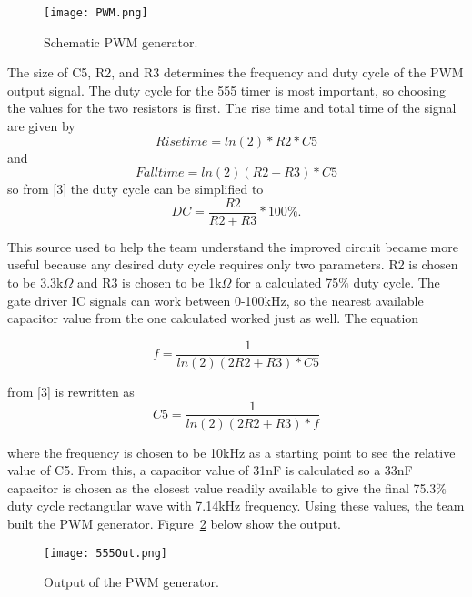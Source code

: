 \documentclass[11pt,letter]{article}
\begin{document}
\begin{figure}[H]
    \centering
    \texttt{[image: PWM.png]}
    \caption{Schematic PWM generator.}
    \label{fig:PWM}
\end{figure}

The size of C5, R2, and R3 determines the frequency and duty cycle of the PWM output signal. The duty cycle for the 555 timer is most important, so choosing the values for the two resistors is first. The rise time and total time of the signal are given by
\begin{equation}
    Risetime = ln(2)*R2*C5
\end{equation}
and
\begin{equation}
     Falltime = ln(2)(R2+R3)*C5
\end{equation}
so from [3] the duty cycle can be simplified to
\begin{equation}
    DC = \frac{R2}{R2+R3}*100\%.
\end{equation}

This source used to help the team understand the improved circuit became more useful because any desired duty cycle requires only two parameters. R2 is chosen to be 3.3k$\Omega$ and R3 is chosen to be 1k$\Omega$ for a calculated 75$\%$ duty cycle. The gate driver IC signals can work between 0-100kHz, so the nearest available capacitor value from the one calculated worked just as well. The equation

\begin{equation}
    f = \frac{1}{ln(2)(2R2+R3)*C5}
\end{equation}

from [3] is rewritten as 
\begin{equation}
    C5 = \frac{1}{ln(2)(2R2+R3)*f}
\end{equation}

where the frequency is chosen to be 10kHz as a starting point to see the relative value of C5. From this, a capacitor value of 31nF is calculated so a 33nF capacitor is chosen as the closest value readily available to give the final 75.3$\%$ duty cycle rectangular wave with 7.14kHz frequency. Using these values, the team built the PWM generator. Figure~\ref{fig:555} below show the output.

\begin{figure}[H]
    \centering
    \texttt{[image: 555Out.png]}
    \caption{Output of the PWM generator.}
    \label{fig:555}
\end{figure}
\end{document}
